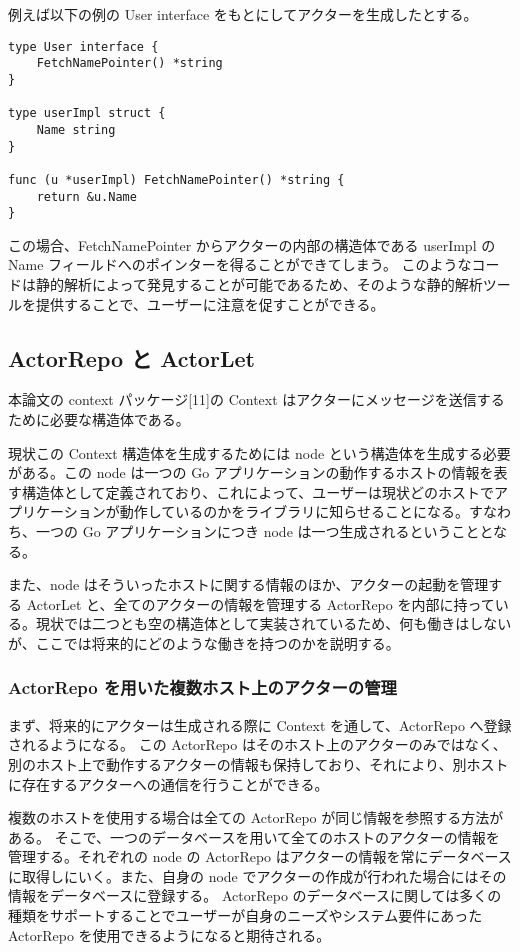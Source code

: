 例えば以下の例の User interface をもとにしてアクターを生成したとする。

\begin{verbatim}
type User interface {
    FetchNamePointer() *string
}

type userImpl struct {
    Name string
}

func (u *userImpl) FetchNamePointer() *string {
    return &u.Name
}
\end{verbatim}

この場合、FetchNamePointer からアクターの内部の構造体である userImpl の
Name フィールドへのポインターを得ることができてしまう。
このようなコードは静的解析によって発見することが可能であるため、そのような静的解析ツールを提供することで、ユーザーに注意を促すことができる。

\subsection{ActorRepo と ActorLet}

本論文の context パッケージ{[}11{]}の Context
はアクターにメッセージを送信するために必要な構造体である。

現状この Context 構造体を生成するためには node
という構造体を生成する必要がある。この node は一つの Go
アプリケーションの動作するホストの情報を表す構造体として定義されており、これによって、ユーザーは現状どのホストでアプリケーションが動作しているのかをライブラリに知らせることになる。すなわち、一つの
Go アプリケーションにつき node は一つ生成されるということとなる。

また、node
はそういったホストに関する情報のほか、アクターの起動を管理する ActorLet
と、全てのアクターの情報を管理する ActorRepo
を内部に持っている。現状では二つとも空の構造体として実装されているため、何も働きはしないが、ここでは将来的にどのような働きを持つのかを説明する。

\subsubsection{ActorRepo を用いた複数ホスト上のアクターの管理}

まず、将来的にアクターは生成される際に Context を通して、ActorRepo
へ登録されるようになる。 この ActorRepo
はそのホスト上のアクターのみではなく、別のホスト上で動作するアクターの情報も保持しており、それにより、別ホストに存在するアクターへの通信を行うことができる。

複数のホストを使用する場合は全ての ActorRepo
が同じ情報を参照する方法がある。
そこで、一つのデータベースを用いて全てのホストのアクターの情報を管理する。それぞれの
node の ActorRepo
はアクターの情報を常にデータベースに取得しにいく。また、自身の node
でアクターの作成が行われた場合にはその情報をデータベースに登録する。
ActorRepo
のデータベースに関しては多くの種類をサポートすることでユーザーが自身のニーズやシステム要件にあった
ActorRepo を使用できるようになると期待される。

